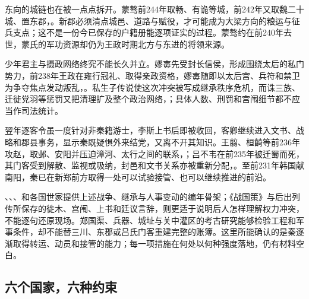 东向的城链也在被一点点拆开。蒙骜前244年取畅、有诡等城，前242年又取魏二十城、置东郡，。新郡必须清点城邑、道路与赋役，才可能成为大梁方向的粮运与征兵支点；这不是一份今已保存的户籍册能逐项证实的过程。蒙骜约在前240年去世，蒙氏的军功资源却仍为王政时期北方与东进的将领来源。

少年君主与摄政网络终究不能长久并立。嫪毐先受封长信侯，形成围绕太后的私门势力，前238年王政在雍行冠礼、取得亲政资格，嫪毐随即以太后宫、兵符和禁卫为争夺焦点发动叛乱，。私生子传说使这次冲突被写成继承秩序危机，而诛三族、迁徙党羽等惩罚又把清理扩及整个政治网络，；具体人数、刑罚和宫闱细节都不应当作司法统计。

翌年逐客令虽一度针对非秦籍游士，李斯上书后即被收回，客卿继续进入文书、战略和郡县事务，显示秦既疑惧外来结党，又离不开其知识。王翦、桓齮等前236年攻赵，取邺、安阳并压迫漳河、太行之间的联系，；吕不韦在前235年被迁蜀而死，其门客受到解散、监视或吸纳，封邑和文书关系亦被重新分配，。至前231年韩国献南阳，秦已在新郑前方取得一处可以试验接管、也可以继续推进的前沿。

\begin{sourcenote}[东出前的材料边界]
、、、和各国世家提供上述战争、继承与人事变动的编年骨架；《战国策》与后出列传所保存的徙木、宫闱、上书和廷议言辞，则更适于说明后人怎样理解权力冲突，不能逐句还原现场。郑国渠、兵器、城址与关中灌区的考古研究能够检验工程和军事条件，却不能替三川、东郡或吕氏门客重建完整的账簿。这里所能确认的是秦逐渐取得转运、动员和接管的能力；每一项措施在何处以何种强度落地，仍有材料空白。
\end{sourcenote}

\subsection{六个国家，六种约束}


